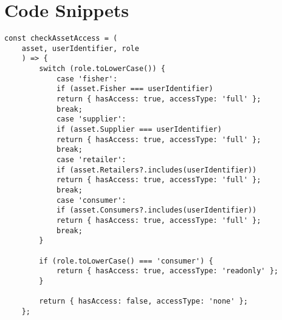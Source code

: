 %
%
%                 

\chapter{Code Snippets}
\label{sec:appendixa}

\begin{lstlisting}[style=customjs, caption={Role-based access logic for tuna asset visibility}]
	const checkAssetAccess = (
	asset, userIdentifier, role
	) => {
		switch (role.toLowerCase()) {
			case 'fisher':
			if (asset.Fisher === userIdentifier)
			return { hasAccess: true, accessType: 'full' };
			break;
			case 'supplier':
			if (asset.Supplier === userIdentifier)
			return { hasAccess: true, accessType: 'full' };
			break;
			case 'retailer':
			if (asset.Retailers?.includes(userIdentifier))
			return { hasAccess: true, accessType: 'full' };
			break;
			case 'consumer':
			if (asset.Consumers?.includes(userIdentifier))
			return { hasAccess: true, accessType: 'full' };
			break;
		}
		
		if (role.toLowerCase() === 'consumer') {
			return { hasAccess: true, accessType: 'readonly' };
		}
		
		return { hasAccess: false, accessType: 'none' };
	};
\end{lstlisting}

